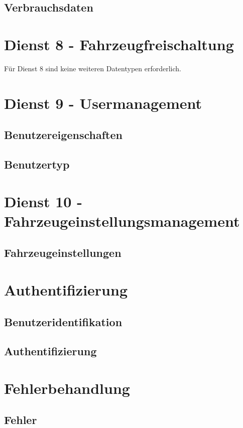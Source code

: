 \subsection*{Verbrauchsdaten}



\section{Dienst 8 - Fahrzeugfreischaltung}
\label{sec:Datenmodell:Dienst8}
Für Dienst 8 sind keine weiteren Datentypen erforderlich.

\section{Dienst 9 - Usermanagement}
\label{sec:Datenmodell:Dienst9}

\subsection*{Benutzereigenschaften}



\subsection*{Benutzertyp}



\section{Dienst 10 - Fahrzeugeinstellungsmanagement}
\label{sec:Datenmodell:Dienst10}

\subsection*{Fahrzeugeinstellungen}



\section{Authentifizierung}
\label{sec:Datenmodell:Auth}

\subsection*{Benutzeridentifikation}



\subsection*{Authentifizierung}




\section{Fehlerbehandlung}
\subsection*{Fehler}


